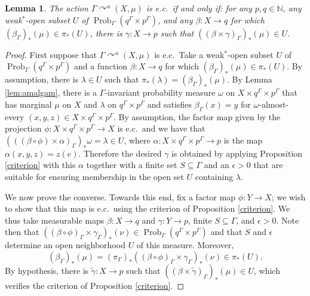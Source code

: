 \documentclass[12pt]{amsart}
\newtheorem{lem}[thm]{Lemma}
\theoremstyle{definition}
\def\bb{\mathbb}
\def\bb{\mathbb}
\begin{document}
\begin{lem}\label{eclemma}
	The action $\Gamma \curvearrowright^a (X,\mu)$ is e.c.\ if and only if:  for any $p,q\in \bb N$, any weak$^*$-open subset $U$ of $\operatorname{Prob}_\Gamma(q^\Gamma\times p^\Gamma)$, and any $\beta:X\to q$ for which $(\beta_\Gamma)_*(\mu)\in \pi_*(U)$, there is $\gamma:X\to p$ such that $((\beta\times \gamma)_\Gamma)_*(\mu)\in U$.
\end{lem}

\begin{proof}
	First suppose that $\Gamma \curvearrowright^a (X,\mu)$ is e.c.\  Take a weak$^*$-open subset $U$ of $\operatorname{Prob}_\Gamma(q^\Gamma\times p^\Gamma)$ and a function $\beta:X\to q$ for which $(\beta_\Gamma)_*(\mu)\in \pi_*(U)$.  By assumption, there is $\lambda\in U$ such that $\pi_*(\lambda)=(\beta_\Gamma)_*(\mu)$. By Lemma \ref{lem:amalgam}, there is a $\Gamma$-invariant probability measure $\omega$ on $X\times q^\Gamma\times p^\Gamma$ that has marginal $\mu$ on $X$ and $\lambda$ on $q^\Gamma\times p^\Gamma$ and satisfies $\beta_\Gamma(x) = y$ for $\omega$-almost-every $(x,y,z) \in X \times q^\Gamma \times p^\Gamma$. By assumption, the factor map given by the projection $\phi:X\times q^\Gamma\times p^\Gamma\to X$ is e.c.\ and we have that $(((\beta \circ \phi) \times \alpha)_\Gamma)_* \omega = \lambda \in U$, where $\alpha : X \times q^\Gamma \times p^\Gamma \rightarrow p$ is the map $\alpha(x,y,z) = z(e)$. Therefore the desired $\gamma$ is obtained by applying Proposition \ref{criterion} with this $\alpha$ together with a finite set $S \subseteq \Gamma$ and an $\epsilon > 0$ that are suitable for ensuring membership in the open set $U$ containing $\lambda$.
    
	We now prove the converse.  Towards this end, fix a factor map $\phi:Y\to X$; we wish to show that this map is e.c.\ using the criterion of Proposition \ref{criterion}.  We thus take measurable maps $\beta:X\to q$ and $\gamma:Y\to p$, finite $S\subseteq \Gamma$, and $\epsilon>0$.  Note then that $((\beta\circ \phi)_\Gamma\times \gamma_\Gamma)_*(\nu)\in \operatorname{Prob}_\Gamma(q^\Gamma\times p^\Gamma)$ and that $S$ and $\epsilon$ determine an open neighborhood $U$ of this measure.  Moreover, 
	$$(\beta_\Gamma)_*(\mu)=(\pi_\Gamma)_*((\beta\circ \phi)_\Gamma\times \gamma_\Gamma)_*(\nu)\in \pi_*(U).$$  By hypothesis, there is $\tilde{\gamma}:X\to p$ such that $((\beta\times \tilde{\gamma})_\Gamma)_*(\mu)\in U$, which verifies the criterion of Proposition \ref{criterion}.
\end{proof}
\end{document}
